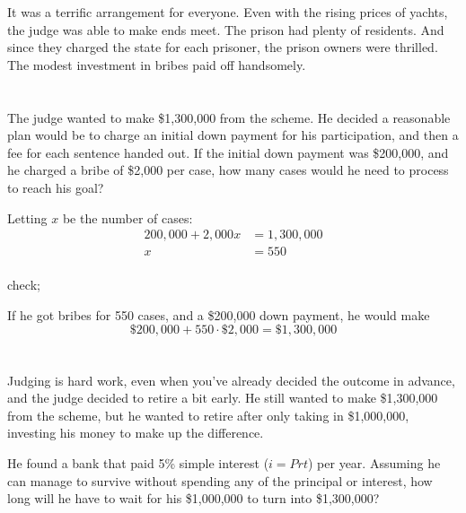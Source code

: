 \documentclass[letterpaper]{exam}
\begin{document}
\begin{questions}
      It was a terrific arrangement for everyone.  Even with the rising prices of yachts, the judge was able to make
      ends meet.  The prison had plenty of residents.  And since they charged the state for each prisoner, the prison
      owners were thrilled. The modest investment in bribes paid off handsomely.

      \begin{parts}
        \part{}
          The judge wanted to make \$1,300,000 from the scheme.  He decided a reasonable plan would be to charge an
          initial down payment for his participation, and then a fee for each sentence handed out.  If the initial down
          payment was \$200,000, and he charged a bribe of \$2,000 per case, how many cases would he need to process to
          reach his goal?

          \begin{solution}
            Letting $x$ be the number of cases:
            \begin{align*}
              200,000 + 2,000x & = 1,300,000 \\
              x                & = \boxed{ 550 } \\
            \end{align*}

            check; 
            
            If he got bribes for 550 cases, and a \$200,000 down payment, he would make 
            \[
              \$200,000 + 550 \cdot \$2,000 = \$1,300,000
            \]
          \end{solution}

        \part{}
          Judging is hard work, even when you've already decided the outcome in advance, and the judge decided to retire
          a bit early.  He still wanted to make \$1,300,000 from the scheme, but he wanted to retire after only taking
          in \$1,000,000, investing his money to make up the difference.  

          He found a bank that paid 5\% simple interest ($i = Prt$) per year. Assuming he can manage to survive without
          spending any of the principal or interest, how long will he have to wait for his \$1,000,000 to turn into
          \$1,300,000?


\end{parts}
\end{questions}
\end{document}

